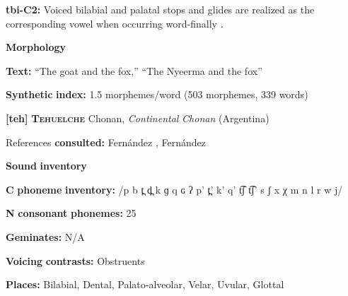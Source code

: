 \documentclass[output=paper]{langsci/langscibook}
\begin{document}
\begin{styleBody}
\textbf{tbi-C2:} Voiced bilabial and palatal stops and glides are realized as the corresponding vowel when occurring word-finally \citep{Stirtz2011}.
\end{styleBody}

\begin{styleBody}
\textbf{Morphology}
\end{styleBody}

\begin{styleBody}
\textbf{Text:} “The goat and the fox,” “The Nyeerma and the fox” \citep[319-326]{Stirtz2011}
\end{styleBody}

\begin{styleBody}
\textbf{Synthetic} \textbf{index:} 1.5 morphemes/word (503 morphemes, 339 words)
\end{styleBody}

\begin{styleBody}
\textbf{[teh]}   \textbf{\textsc{Tehuelche}}  Chonan, \textit{Continental} \textit{Chonan} (Argentina)
\end{styleBody}

\begin{styleBody}
References \textbf{consulted:} Fernández \citet{Garay1998}, Fernández \citet{GarayHernández2006}
\end{styleBody}

\begin{styleBody}
\textbf{Sound} \textbf{inventory}
\end{styleBody}

\begin{styleBody}
\textbf{C} \textbf{phoneme} \textbf{inventory:} /p b t̪ d̪ k ɡ q ɢ ʔ p’ t̪’ k’ q’ t͡ʃ t͡ʃ’ s ʃ x χ m n l r w j/
\end{styleBody}

\begin{styleBody}
\textbf{N} \textbf{consonant} \textbf{phonemes:} 25
\end{styleBody}

\begin{styleBody}
\textbf{Geminates:} N/A
\end{styleBody}

\begin{styleBody}
\textbf{Voicing} \textbf{contrasts:} Obstruents
\end{styleBody}

\begin{styleBody}
\textbf{Places:} Bilabial, Dental, Palato-alveolar, Velar, Uvular, Glottal
\end{styleBody}
\end{document}
